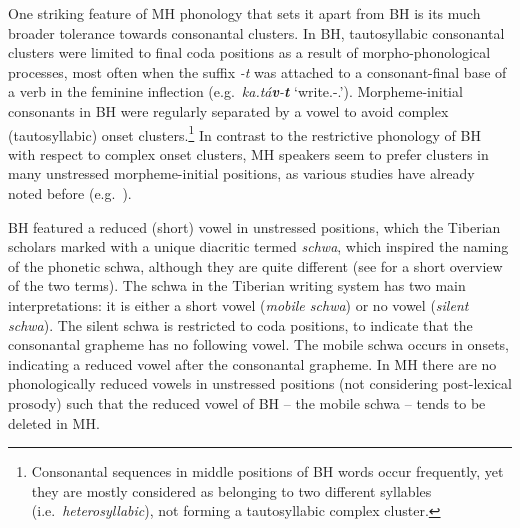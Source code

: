 
One striking feature of MH phonology that sets it apart from BH is its much broader tolerance towards consonantal clusters.
In BH, tautosyllabic consonantal clusters were limited to final coda positions as a result of morpho-phonological processes, most often when the suffix \emph{-t} was attached to a consonant-final base of a verb in the feminine inflection (e.g.~\emph{ka.tá\textbf{v}-\textbf{t}} `write.\Pst{}-\Second{}\Sg{}.\F{}'). Morpheme-initial consonants in BH were regularly separated by a vowel to avoid complex (tautosyllabic) onset clusters.\footnote{Consonantal sequences in middle positions of BH words occur frequently, yet they are mostly considered as belonging to two different syllables (i.e.~\emph{heterosyllabic}), not forming a tautosyllabic complex cluster.} In contrast to the restrictive phonology of BH with respect to complex onset clusters, MH speakers seem to prefer clusters in many unstressed morpheme-initial positions, as various studies have already noted before (e.g.~\citealt{rosen1956haivritsk, albert2013hebrewsk, asherov2019syllablesk, bat2008morphologicallysk, bolozky1978somesk, bolozky2006notesk, cohen2015syllablesk, laufer1991phonemesk, schwarzwald2005modernsk}).

BH featured a reduced (short) vowel in unstressed positions, which the Tiberian scholars marked with a unique diacritic termed \emph{schwa}, which inspired the naming of the phonetic schwa, although they are quite different (see \citealt{laufer2019originsk} for a short overview of the two terms).
The schwa in the Tiberian writing system has two main interpretations: it is either a short vowel (\emph{mobile schwa}) or no vowel (\emph{silent schwa}). The silent schwa is restricted to coda positions, to indicate that the consonantal grapheme has no following vowel. The mobile schwa occurs in onsets, indicating a reduced vowel after the consonantal grapheme.
In MH there are no phonologically reduced vowels in unstressed positions (not considering post-lexical prosody) such that the reduced vowel of BH -- the mobile schwa -- tends to be deleted in MH.

